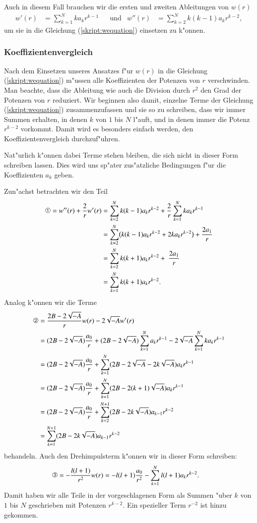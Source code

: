 Auch in diesem Fall brauchen wir die ersten und zweiten Ableitungen von
$w(r)$
\[
\begin{aligned}
w'(r)&=\sum_{k=1}^Nka_kr^{k-1}
&&\text{und}
&
w''(r)&=\sum_{k=2}^Nk(k-1)a_kr^{k-2},
\end{aligned}
\]
um sie in die Gleichung (\ref{skript:wequation}) einsetzen zu k"onnen.

\subsubsection{Koeffizientenvergleich}
Nach dem Einsetzen unseres Ansatzes f"ur $w(r)$ in die Gleichung
(\ref{skript:wequation})
m"ussen alle Koeffizienten der Potenzen von $r$ verschwinden.
Man beachte, dass die Ableitung wie auch die Division durch $r^2$ den
Grad der Potenzen von $r$ reduziert.
Wir beginnen also damit, einzelne Terme der Gleichung
(\ref{skript:wequation}) zusammenzufassen und sie so zu schreiben,
dass wir immer Summen erhalten, in denen $k$ von $1$ bis $N$ l"auft, 
und in denen immer die Potenz $r^{k-2}$ vorkommt.
Damit wird es besonders einfach werden, den Koeffizientenvergleich
durchzuf"uhren.

Nat"urlich k"onnen dabei Terme stehen bleiben, die
sich nicht in dieser Form schreiben lassen.
Dies wird uns sp"ater zus"atzliche Bedingungen f"ur die Koeffizienten $a_k$
geben.

Zun"achst betrachten wir den Teil
\begin{align*}
\text{\ding{192}}=
w''(r)+\frac2{r}w'(r)
&=
\sum_{k=2}^N k(k-1)a_kr^{k-2} + \frac{2}{r}\sum_{k=1}^Nka_kr^{k-1}
\\
&=
\sum_{k=2}^N\bigl(k(k-1)a_kr^{k-2} + 2ka_kr^{k-2}\bigr) + \frac{2a_1}{r}
\\
&=
\sum_{k=2}^Nk(k+1)a_kr^{k-2} + \frac{2a_1}r
\\
&=
\sum_{k=1}^Nk(k+1)a_kr^{k-2}.
\end{align*}
Analog k"onnen wir die Terme 
\begin{align*}
\text{\ding{193}}&=
\frac{2B-2\sqrt{-A}}{r}w(r)-2\sqrt{-A}w'(r)
\\
&=
(2B-2\sqrt{-A})\frac{a_0}{r}
+
(2B-2\sqrt{-A})\sum_{k=1}^Na_kr^{k-1}
-2\sqrt{-A}\sum_{k=1}^Nka_kr^{k-1}
\\
&=
(2B-2\sqrt{-A})\frac{a_0}{r}
+
\sum_{k=1}^N
(2B-2\sqrt{-A}
-2k\sqrt{-A})a_kr^{k-1}
\\
&=
(2B-2\sqrt{-A})\frac{a_0}{r}
+
\sum_{k=1}^N
(2B-2(k+1)\sqrt{-A})a_kr^{k-1}
\\
&=
(2B-2\sqrt{-A})\frac{a_0}{r}
+
\sum_{k=2}^{N+1}
(2B-2k\sqrt{-A})a_{k-1}r^{k-2}
\\
&=
\sum_{k=1}^{N+1}
(2B-2k\sqrt{-A})a_{k-1}r^{k-2}
\end{align*}
behandeln.
Auch den Drehimpulsterm k"onnen wir in dieser Form schreiben:
\begin{align*}
\text{\ding{194}}=
-\frac{l(l+1)}{r^2}w(r)
&=
-l(l+1)\frac{a_0}{r^2}
-
\sum_{k=1}^Nl(l+1)a_kr^{k-2}.
\end{align*}
Damit haben wir alle Teile in der vorgeschlagenen Form als Summen
"uber $k$ von $1$ bis $N$ geschrieben mit Potenzen $r^{k-2}$.
Ein spezieller Term $r^{-2}$ ist hinzu gekommen.

